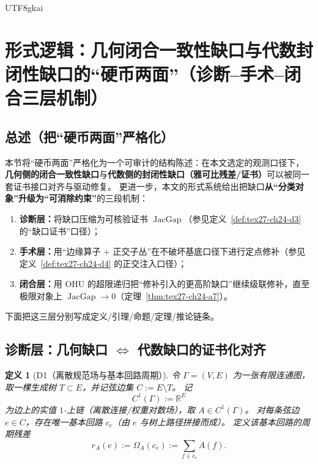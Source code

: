 \documentclass[12pt]{article}
\newtheorem{definition}{定义}[section]
\newcommand{\RR}{\mathbb{R}}
\newcommand{\JacGap}{\operatorname{JacGap}}
\begin{document}
\begin{CJK*}{UTF8}{gkai}
\clearpage

\section{形式逻辑：几何闭合一致性缺口与代数封闭性缺口的“硬币两面”（诊断--手术--闭合三层机制）}
\label{sec:tex27-ch28-coin-geo-alg-gap}

\subsection{总述（把“硬币两面”严格化）}
\label{subsec:tex27-ch28-overview}

本节将“硬币两面”严格化为一个可审计的结构陈述：在本文选定的观测口径下，
\textbf{几何侧的闭合一致性缺口}与\textbf{代数侧的封闭性缺口（雅可比残差/证书）}可以被同一套证书接口对齐与驱动修复。
更进一步，本文的形式系统给出把缺口\textbf{从“分类对象”升级为“可消除约束”}的三段机制：
\begin{enumerate}
  \item \textbf{诊断层：}将缺口压缩为可核验证书 $\JacGap$（参见定义~\ref{def:tex27-ch24-d3} 的“缺口证书”口径）；
  \item \textbf{手术层：}用“边缘算子 + 正交子丛”在不破坏基底口径下进行定点修补（参见定义~\ref{def:tex27-ch24-d4} 的正交注入口径）；
  \item \textbf{闭合层：}用 OHU 的超限递归把“修补引入的更高阶缺口”继续级联修补，直至极限对象上 $\JacGap\to 0$（定理~\ref{thm:tex27-ch24-a7}）。
\end{enumerate}
下面把这三层分别写成定义/引理/命题/定理/推论链条。

\subsection{诊断层：几何缺口 $\Leftrightarrow$ 代数缺口的证书化对齐}
\label{subsec:tex27-ch28-diagnosis}

\begin{definition}[D1（离散规范场与基本回路周期）]
\label{def:tex27-ch28-d1}
令 $\Gamma=(V,E)$ 为一张有限连通图，取一棵生成树 $T\subset E$，并记弦边集 $C:=E\setminus T$。
记
\[
  C^1(\Gamma):=\RR^{E}
\]
为边上的实值 $1$-上链（离散连接/权重对数场），取 $A\in C^1(\Gamma)$。
对每条弦边 $e\in C$，存在唯一基本回路 $c_e$（由 $e$ 与树上路径拼接而成）。
定义该基本回路的周期残差
\[
  r_A(e):=\Omega_A(c_e):=\sum_{f\in c_e}A(f).
\]
\end{definition}


\end{CJK*}
\end{document}
